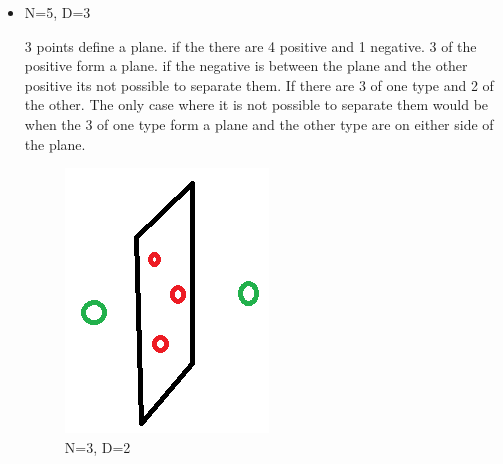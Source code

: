 \documentclass[fontsize=10pt,DIV=14]{scrartcl}
\begin{document}
\begin{itemize}
		\item
		N=5, D=3

		3 points define a plane. if the there are 4 positive and 1 negative. 3 of the positive form a plane. if the negative is between the plane and the other positive its not possible to separate them. If there are 3 of one type and 2 of the other. The only case where it is not possible to separate them would be when the 3 of one type form a plane and the other type are on either side of the plane.

		\begin{figure}[H]
			\begin{center}
				\includegraphics[scale=1.0]{resources/q4_img4.png}
				\caption{N=3, D=2}
			\end{center}
		\end{figure}
	\end{itemize}
\end{document}
